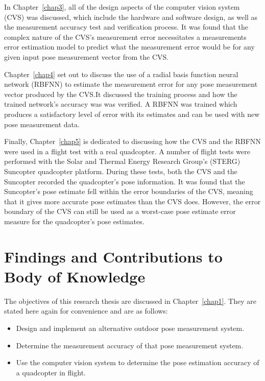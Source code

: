 In Chapter~\ref{chap3}, all of the design aspects of the computer vision system (CVS) was discussed, which include the hardware and software design, as well as the measurement accuracy test and verification process. It was found that the complex nature of the CVS's measurement error necessitates a measurements error estimation model to predict what the measurement error would be for any given input pose measurement vector from the CVS.\@ 

Chapter~\ref{chap4} set out to discuss the use of a radial basis function neural network (RBFNN) to estimate the measurement error for any pose measurement vector produced by the CVS.\@ It discussed the training process and how the trained network's accuracy was was verified. A RBFNN was trained which produces a satisfactory level of error with its estimates and can be used with new pose measurement data.

Finally, Chapter~\ref{chap5} is dedicated to discussing how the CVS and the RBFNN were used in a flight test with a real quadcopter. A number of flight tests were performed with the Solar and Thermal Energy Research Group's (STERG) Suncopter quadcopter platform. During these tests, both the CVS and the Suncopter recorded the quadcopter's pose information. It was found that the Suncopter's pose estimate fell within the error boundaries of the CVS, meaning that it gives more accurate pose estimates than the CVS does. However, the error boundary of the CVS can still be used as a worst-case pose estimate error measure for the quadcopter's pose estimates. 

\section{Findings and Contributions to Body of Knowledge}

The objectives of this research thesis are discussed in Chapter~\ref{chap1}. They are stated here again for convenience and are as follows:

\begin{itemize}
  \item Design and implement an alternative outdoor pose measurement system.
  \item Determine the measurement accuracy of that pose measurement system.
  \item Use the computer vision system to determine the pose estimation accuracy of a quadcopter in flight. 
\end{itemize}

